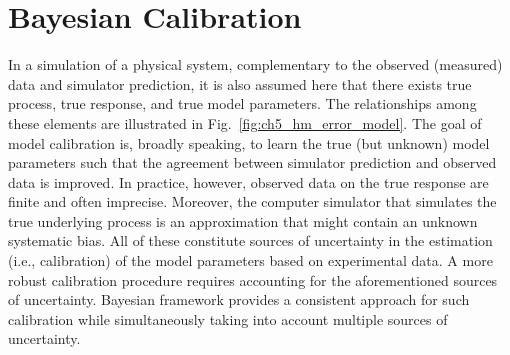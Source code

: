 \section{Bayesian Calibration}\label{sec:bc_modular_bayes}

In a simulation of a physical system, complementary to the observed (measured) data and simulator prediction, it is also assumed here that there exists true process, true response, and true model parameters. 
The relationships among these elements are illustrated in Fig.~\ref{fig:ch5_hm_error_model}.
The goal of model calibration is, broadly speaking, to learn the true (but unknown) model parameters such that the agreement between simulator prediction and observed data is improved.
In practice, however, observed data on the true response are finite and often imprecise.
Moreover, the computer simulator that simulates the true underlying process is an approximation that might contain an unknown systematic bias.
All of these constitute sources of uncertainty in the estimation (i.e., calibration) of the model parameters based on experimental data.
A more robust calibration procedure requires accounting for the aforementioned sources of uncertainty.
Bayesian framework provides a consistent approach for such calibration while simultaneously taking into account multiple sources of uncertainty.
